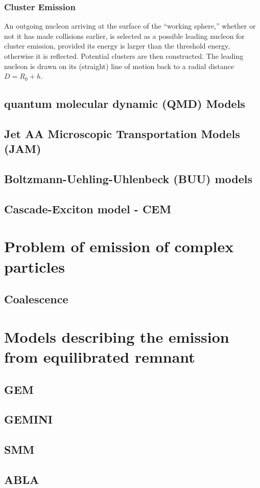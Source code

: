 \subsubsection{Cluster Emission}
An outgoing nucleon arriving at the surface of the “working sphere,” whether or not it has made collisions earlier, is selected as a possible leading nucleon for cluster emission, provided its energy is larger than the threshold energy, otherwise it is reflected.
Potential clusters are then constructed. The leading nucleon is drawn on its (straight) line of motion back to a radial distance
$D=R_{0}+h$.
\subsection{quantum molecular dynamic (QMD) Models}
\subsection{Jet AA Microscopic Transportation Models (JAM) }
\subsection{Boltzmann-Uehling-Uhlenbeck (BUU) models}
\subsection{Cascade-Exciton model - CEM}
\section{Problem of emission of complex particles}
\subsection{Coalescence}
\section{Models describing the emission from equilibrated remnant}
\subsection{GEM}
\subsection{GEMINI}
\subsection{SMM}
\subsection{ABLA}